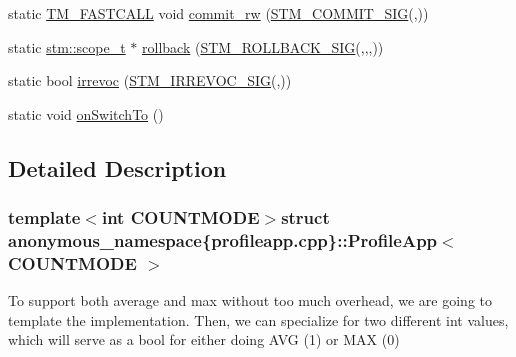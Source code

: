 \begin{DoxyCompactItemize}
\item 
static \hyperlink{platform_8hpp_a8b5d728e6eed8f368f9966f637d2f719}{T\-M\-\_\-\-F\-A\-S\-T\-C\-A\-L\-L} void \hyperlink{structanonymous__namespace_02profileapp_8cpp_03_1_1ProfileApp_af7ed05237f3b2ef85c23bea1ef2f9d6c}{commit\-\_\-rw} (\hyperlink{include_2stm_2macros_8hpp_a1b8304eb1082517c7dc31f3534b72343}{S\-T\-M\-\_\-\-C\-O\-M\-M\-I\-T\-\_\-\-S\-I\-G}(,))
\item 
static \hyperlink{namespacestm_a91badf88c88aacc831b01a315435a255}{stm\-::scope\-\_\-t} $\ast$ \hyperlink{structanonymous__namespace_02profileapp_8cpp_03_1_1ProfileApp_ae9d2d22881613fa1100bdce8965bc701}{rollback} (\hyperlink{include_2stm_2macros_8hpp_a1c36a48149c84f90d5bca01019950ca9}{S\-T\-M\-\_\-\-R\-O\-L\-L\-B\-A\-C\-K\-\_\-\-S\-I\-G}(,,,))
\item 
static bool \hyperlink{structanonymous__namespace_02profileapp_8cpp_03_1_1ProfileApp_a7729ca833139c5edfc9e6a143bc7e311}{irrevoc} (\hyperlink{include_2stm_2macros_8hpp_acf117c2df6442342f6603e1a12fa3b5c}{S\-T\-M\-\_\-\-I\-R\-R\-E\-V\-O\-C\-\_\-\-S\-I\-G}(,))
\item 
static void \hyperlink{structanonymous__namespace_02profileapp_8cpp_03_1_1ProfileApp_a1985135805b2ff1ca97c86b7bbad90e8}{on\-Switch\-To} ()
\end{DoxyCompactItemize}


\subsection{Detailed Description}
\subsubsection*{template$<$int C\-O\-U\-N\-T\-M\-O\-D\-E$>$struct anonymous\-\_\-namespace\{profileapp.\-cpp\}\-::\-Profile\-App$<$ C\-O\-U\-N\-T\-M\-O\-D\-E $>$}

To support both average and max without too much overhead, we are going to template the implementation. Then, we can specialize for two different int values, which will serve as a bool for either doing A\-V\-G (1) or M\-A\-X (0) 

